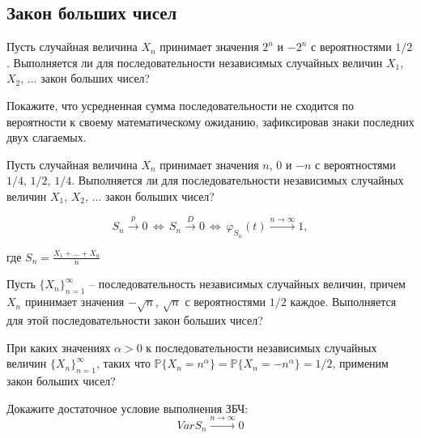 \subsection{Закон больших чисел}

\begin{problem}
Пусть случайная величина $X_n$ принимает значения 
$2^n$ и $-2^n$ с вероятностями $1/2$. Выполняется ли для последовательности независимых случайных величин 
$X_1$, $X_2$, $\ldots$ закон больших чисел? 
\end{problem}

\begin{ordre}
Покажите, что усредненная сумма последовательности не сходится по вероятности к своему математическому ожиданию, зафиксировав знаки последних двух слагаемых. 
\end{ordre}


\begin{problem}
Пусть случайная величина $X_n$ принимает значения 
$n$, $0$ и $-n$ с вероятностями $1/4$, $1/2$, $1/4$. Выполняется ли для последовательности независимых случайных величин 
$X_1$, $X_2$, $\ldots$ закон больших чисел? 
\end{problem}

\begin{ordre}
 
$$
S_n\xrightarrow{p}0 \,\Leftrightarrow\, S_n\xrightarrow{D}0 \,\Leftrightarrow\, \varphi_{S_n}(t)
\xrightarrow{n\to\infty}1 , 
$$

где $S_n=\frac{X_1+\ldots +X_n}{n}$

\end{ordre}


\begin{problem}
Пусть $\{ X_n\}_{n=1}^{\infty}$ -- последовательность независимых случайных величин, причем $X_n$ принимает значения 
$-\sqrt{n}$, $\sqrt{n}$ с вероятностями $1/2$ каждое. 
Выполняется для этой последовательности закон больших чисел? 
\end{problem}


\begin{problem}
При каких значениях $\alpha > 0$ к последовательности независимых случайных величин $\{ X_n\}_{n=1}^{\infty}$, 
таких что ${\mathbb P}\{ X_n=n^{\alpha}\}={\mathbb P}\{ X_n=-n^{\alpha}\}=1/2$, применим закон больших чисел? 
\end{problem}

\begin{ordre}
Докажите достаточное условие выполнения ЗБЧ:
 \[
Var S_n \xrightarrow {n\to\infty}0
\] 
\end{ordre}


